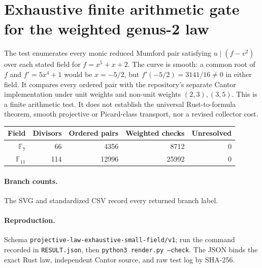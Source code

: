 \documentclass[11pt]{article}
\begin{document}
\section*{Exhaustive finite arithmetic gate for the weighted genus-2 law}
The test enumerates every monic reduced Mumford pair satisfying
\(u\mid(f-v^2)\) over each stated field for
\(f=x^5+x+2\). The curve is smooth: a common root of
\(f\) and \(f'=5x^4+1\) would be \(x=-5/2\),
but \(f'(-5/2)=3141/16\ne0\) in either field.
It compares every ordered pair with the repository's separate Cantor
implementation under unit weights and non-unit weights \( (2,3),(3,5)\).
This is a finite arithmetic test. It does not establish the universal
Rust-to-formula theorem, smooth projective or Picard-class transport,
nor a revised collector cost.
\begin{longtable}{rrrrr}
Field & Divisors & Ordered pairs & Weighted checks & Unresolved\\\hline
$\mathbb{F}_{7}$ & 66 & 4356 & 8712 & 0\\
$\mathbb{F}_{11}$ & 114 & 12996 & 25992 & 0\\
\end{longtable}
\paragraph{Branch counts.} The SVG and standardized CSV record every returned branch label.
\paragraph{Reproduction.} Schema \texttt{projective-law-exhaustive-small-field/v1}; run the command recorded in \texttt{RESULT.json}, then \texttt{python3 render.py --check}. The JSON binds the exact Rust law, independent Cantor source, and raw test log by SHA-256.
\end{document}

